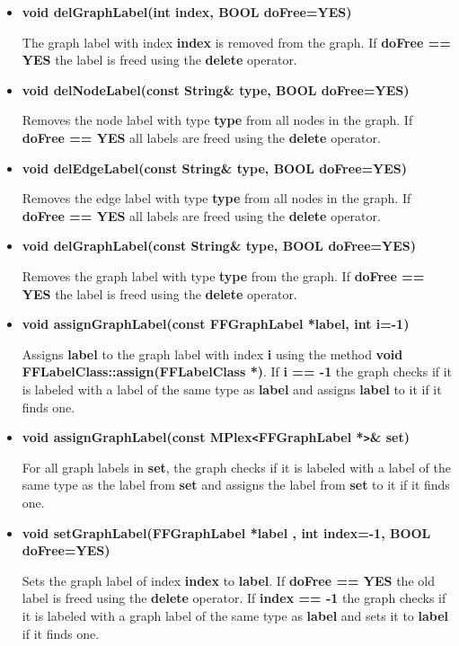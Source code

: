 \begin{itemize}
\item{\bf void delGraphLabel(int index, BOOL doFree=YES)}

The graph label with index {\bf index} is removed from the graph. 
If {\bf doFree == YES} the label is freed using the {\bf delete} 
operator.

\item{\bf void delNodeLabel(const String\& type, BOOL doFree=YES)}
  
  Removes the node label with type {\bf type} from all nodes in
  the graph. If {\bf doFree == YES} all labels are freed using
  the {\bf delete} operator.

\item{\bf void delEdgeLabel(const String\& type, BOOL doFree=YES)}
  
  Removes the edge label with type {\bf type} from all nodes in
  the graph. If {\bf doFree == YES} all labels are freed using
  the {\bf delete} operator.

\item{\bf void delGraphLabel(const String\& type, BOOL doFree=YES)}
  
  Removes the graph label with type {\bf type} from the graph.
  If {\bf doFree == YES} the label is freed using the {\bf
    delete} operator.
  
\item{\bf void assignGraphLabel(const FFGraphLabel *label, int
    i=-1)}
  
  Assigns {\bf label} to the graph label with index {\bf i} using
  the method {\bf void FFLabelClass::assign(FFLabelClass *)}.  If
  {\bf i == -1} the graph checks if it is labeled with a label of
  the same type as {\bf label} and assigns {\bf label} to it if
  it finds one.
  
\item{\bf void assignGraphLabel(const MPlex\verb|<|FFGraphLabel
    *\verb|>|\& set)}
  
  For all graph labels in {\bf set}, the graph checks if it is
  labeled with a label of the same type as the label from {\bf
    set} and assigns the label from {\bf set} to it if it finds
  one.
        
\item{\bf void setGraphLabel(FFGraphLabel *label , int index=-1,
    BOOL doFree=YES)}
  
  Sets the graph label of index {\bf index} to {\bf label}. If
  {\bf doFree == YES} the old label is freed using the {\bf
    delete} operator. If {\bf index == -1} the graph checks if
  it is labeled with a graph label of the same type as {\bf
    label} and sets it to {\bf label} if it finds one.
  

\end{itemize}

